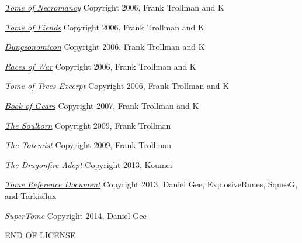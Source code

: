 \begin{small}
\begin{enumerate}
\href{http://www.tgdmb.com/viewtopic.php?t=34248}{\textit{Tome of Necromancy}} Copyright 2006, Frank Trollman and K

\href{http://www.tgdmb.com/viewtopic.php?t=28828}{\textit{Tome of Fiends}} Copyright 2006, Frank Trollman and K

\href{http://www.tgdmb.com/viewtopic.php?t=28547}{\textit{Dungeonomicon}} Copyright 2006, Frank Trollman and K

\href{http://www.tgdmb.com/viewtopic.php?t=33294}{\textit{Races of War}} Copyright 2006, Frank Trollman and K

\href{http://www.tgdmb.com/viewtopic.php?t=33294}{\textit{Tome of Trees Excerpt}} Copyright 2006, Frank Trollman and K

\href{http://www.tgdmb.com/viewtopic.php?t=35813}{\textit{Book of Gears}} Copyright 2007, Frank Trollman and K

\href{http://www.tgdmb.com/viewtopic.php?t=50472}{\textit{The Soulborn}} Copyright 2009, Frank Trollman

\href{http://www.tgdmb.com/viewtopic.php?t=50483}{\textit{The Totemist}} Copyright 2009, Frank Trollman

\href{http://www.tgdmb.com/viewtopic.php?p=318737}{\textit{The Dragonfire Adept}} Copyright 2013, Koumei

\href{https://github.com/SqueeG/awesomeTome}{\textit{Tome Reference Document}} Copyright 2013, Daniel Gee, ExplosiveRunes, SqueeG, and Tarkisflux

\href{https://github.com/Lokathor/SuperTome}{\textit{SuperTome}} Copyright 2014, Daniel Gee
\end{enumerate}

END OF LICENSE

\end{small}